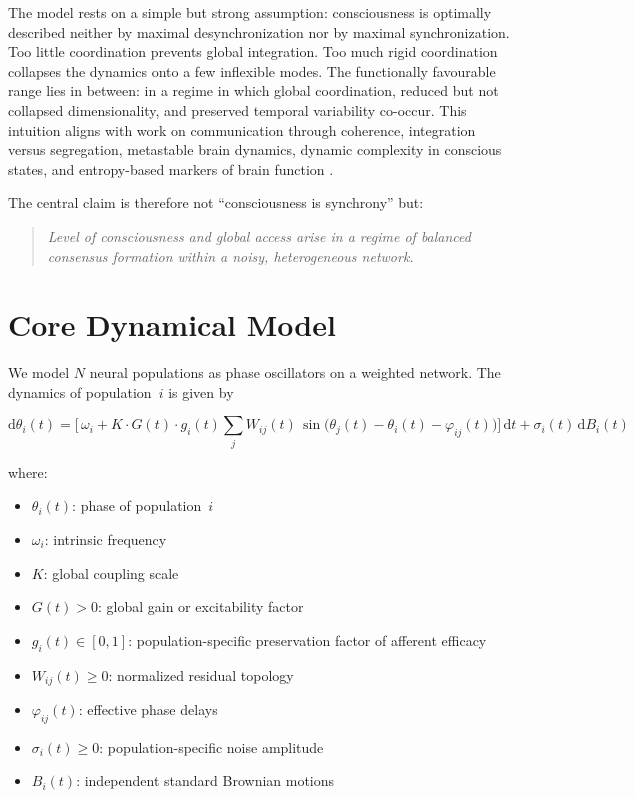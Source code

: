 \documentclass[11pt,a4paper]{article}
\theoremstyle{plain}
\theoremstyle{definition}
\theoremstyle{remark}
\begin{document}
The model rests on a simple but strong assumption: consciousness is optimally described neither by maximal desynchronization nor by maximal synchronization. Too little coordination prevents global integration. Too much rigid coordination collapses the dynamics onto a few inflexible modes. The functionally favourable range lies in between: in a regime in which global coordination, reduced but not collapsed dimensionality, and preserved temporal variability co-occur. This intuition aligns with work on communication through coherence, integration versus segregation, metastable brain dynamics, dynamic complexity in conscious states, and entropy-based markers of brain function \citep{fries2015,kelso2012,deco2017,demertzi2019,carhartharris2014,tagliazucchi2016}.

The central claim is therefore not ``consciousness is synchrony'' but:

\begin{quote}
\itshape
Level of consciousness and global access arise in a regime of balanced consensus formation within a noisy, heterogeneous network.
\end{quote}


\section{Core Dynamical Model}
\label{sec:core}
\label{sec:kernmodell}

We model $N$ neural populations as phase oscillators on a weighted network. The dynamics of population~$i$ is given by

\begin{equation}
\label{eq:dynamics}
\mathrm{d}\theta_i(t)
= \biggl[\,\omega_i
+ K \cdot G(t) \cdot g_i(t) \sum_{j} W_{ij}(t)\,\sin\!\bigl(\theta_j(t) - \theta_i(t) - \varphi_{ij}(t)\bigr)
\biggr]\,\mathrm{d}t
+ \sigma_i(t)\,\mathrm{d}B_i(t)
\end{equation}

where:
\begin{itemize}
  \item $\theta_i(t)$: phase of population~$i$
  \item $\omega_i$: intrinsic frequency
  \item $K$: global coupling scale
  \item $G(t) > 0$: global gain or excitability factor
  \item $g_i(t) \in [0,1]$: population-specific preservation factor of afferent efficacy
  \item $W_{ij}(t) \geq 0$: normalized residual topology
  \item $\varphi_{ij}(t)$: effective phase delays
  \item $\sigma_i(t) \geq 0$: population-specific noise amplitude
  \item $B_i(t)$: independent standard Brownian motions
\end{itemize}
\end{document}
